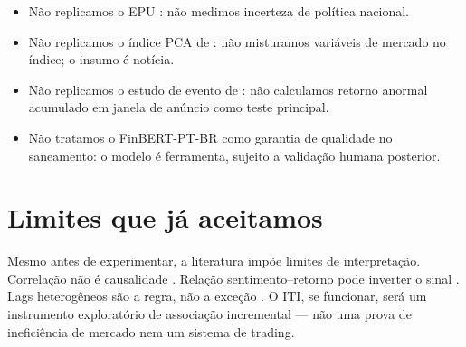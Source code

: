 \begin{itemize}
  \item Não replicamos o EPU \cite{baker2016epu}: não medimos incerteza de política nacional.
  \item Não replicamos o índice PCA de : não misturamos variáveis de mercado no índice; o insumo é notícia.
  \item Não replicamos o estudo de evento de : não calculamos retorno anormal acumulado em janela de anúncio como teste principal.
  \item Não tratamos o FinBERT-PT-BR como garantia de qualidade no saneamento: o modelo é ferramenta, sujeito a validação humana posterior.
\end{itemize}
\fi

\section{Limites que já aceitamos}

Mesmo antes de experimentar, a literatura impõe limites de interpretação. Correlação não é causalidade \cite{utfpr2024bert}. Relação sentimento--retorno pode inverter o sinal \cite{yoshinaga2012sentimento}. Lags heterogêneos são a regra, não a exceção \cite{eramiars2025correlacao}. O ITI, se funcionar, será um instrumento exploratório de associação incremental --- não uma prova de ineficiência de mercado nem um sistema de trading.
